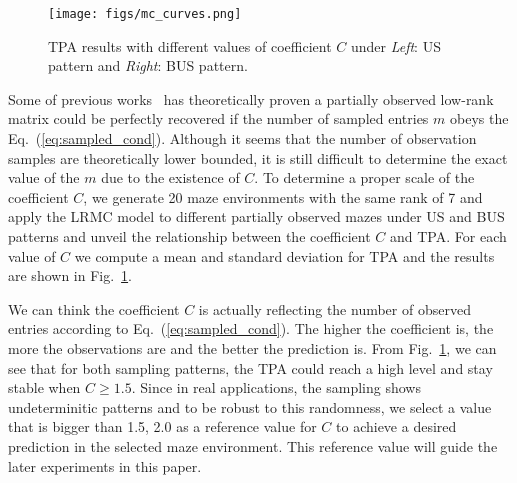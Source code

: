 \begin{figure} \vspace{-6pt}
  \centering
  	{\label{fig:mc_curves}\texttt{[image: figs/mc\_curves.png]}}
  \caption{\small TPA results with different values of coefficient $C$ under \textit{Left}: US pattern and \textit{Right}: BUS pattern.
  } \vspace{-10pt}
\label{fig:mc_curves}  
\end{figure}

Some of previous works~\cite{candes2009exact} has theoretically proven a partially observed low-rank matrix could be perfectly recovered if the number of sampled entries $m$ obeys the Eq.~(\ref{eq:sampled_cond}). Although it seems that the number of observation samples are theoretically lower bounded, it is still difficult to determine the exact value of the $m$ due to the existence of $C$. To determine a proper scale of the coefficient $C$, we generate 20 maze environments with the same rank of 7 and apply the LRMC model to different partially observed mazes under US and BUS patterns and unveil the relationship between the coefficient $C$ and TPA. For each value of $C$ we compute a mean and standard deviation for TPA and the results are shown in Fig.~\ref{fig:mc_curves}.

We can think the coefficient $C$ is actually reflecting the number of observed entries according to Eq.~(\ref{eq:sampled_cond}). The higher the coefficient is, the more the observations are and the better the prediction is. From Fig.~\ref{fig:mc_curves}, we can see that for both sampling patterns, the TPA could reach a high level and stay stable when $C\geq 1.5$. Since in real applications, the sampling shows undeterminitic patterns and to be robust to this randomness, we select a value that is bigger than 1.5, 2.0 as a reference value for $C$ to achieve a desired prediction in the selected maze environment. This reference value will guide the later experiments in this paper.

